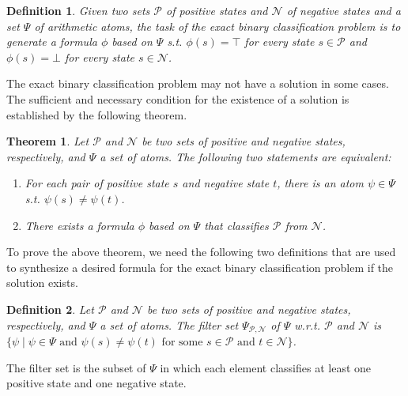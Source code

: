\documentclass[review]{elsarticle}
\newcommand{\set}[1]{\{ #1 \}}
\newcommand{\true}{\top}
\newcommand{\false}{\bot}
\newcommand{\positiveSet}{\mathcal{P}}
\newcommand{\negativeSet}{\mathcal{N}}
\newcommand{\featureSet}{\Psi}
\newtheorem{definition}{Definition}
\newtheorem{theorem}{Theorem}
\begin{document}
	\begin{definition} \rm \label{def:extBinClass}
		Given two sets $\positiveSet$ of positive states and $\negativeSet$ of negative states and a set $\featureSet$ of arithmetic atoms, the task of the exact binary classification problem is to generate a formula $\phi$ based on $\featureSet$ s.t. $\phi(s) = \true$ for every state $s \in \positiveSet$ and $\phi(s) = \false$ for every state $s \in \negativeSet$.
	\end{definition}
	
	
	The exact binary classification problem may not have a solution in some cases.
	The sufficient and necessary condition for the existence of a solution is established by the following theorem.
		
	\begin{theorem}\label{thm:exactBinClass}
		Let $\positiveSet$ and $\negativeSet$ be two sets of positive and negative states, respectively, and $\featureSet$ a set of atoms.
		The following two statements are equivalent:
		\begin{enumerate}
			\item For each pair of positive state $s$ and negative state $t$, there is an atom $\psi \in \featureSet$ s.t. $\psi(s) \neq \psi(t)$.
			\item There exists a formula $\phi$ based on $\featureSet$ that classifies $\positiveSet$ from $\negativeSet$.
		\end{enumerate}
	\end{theorem}

	To prove the above theorem, we need the following two definitions that are used to synthesize a desired formula for the exact binary classification problem if the solution exists.
	
	\begin{definition}\label{def:filterSet} \rm
		Let $\positiveSet$ and $\negativeSet$ be two sets of positive and negative states, respectively, and $\featureSet$ a set of atoms.
		The \textit{filter set} $\featureSet_{\positiveSet, \negativeSet}$ of $\featureSet$ w.r.t. $\positiveSet$ and $\negativeSet$ is $\set{\psi \mid \psi \in \featureSet \text{ and } \psi(s) \neq \psi(t) \text{ for some } s \in \positiveSet \text{ and } t \in \negativeSet}$.
	\end{definition}
	
	The filter set is the subset of $\featureSet$ in which each element classifies at least one positive state and one negative state.
	
\end{document}
